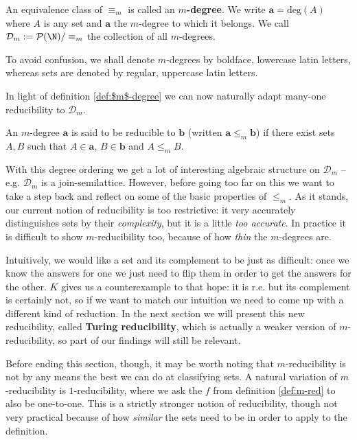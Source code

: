 \documentclass[../main.tex]{memoir}
\begin{document}
\begin{definition}
  \label{def:$m$-degree}
  An equivalence class of $\equiv_m$ is called an \textbf{$m$-degree}. We write $\mathbf{a} = \text{deg}(A)$ where $A$ is any set and $\mathbf{a}$ the $m$-degree to which it belongs. We call $\mathbf{\mathcal{D}}_m := \mathcal{P}(\N) / \equiv_m$ the collection of all $m$-degrees.
\end{definition}

\begin{remark}
  To avoid confusion, we shall denote $m$-degrees by boldface, lowercase latin letters, whereas sets are denoted by regular, uppercase latin letters.
\end{remark}

In light of definition \ref{def:$m$-degree} we can now naturally adapt many-one reducibility to $\mathbf{\mathcal{D}}_m$.

\begin{definition}
  An $m$-degree $\mathbf{a}$ is said to be reducible to $\mathbf{b}$ (written $\mathbf{a} \le_m \mathbf{b}$) if there exist sets $A, B$ such that $A \in \mathbf{a}$, $B \in \mathbf{b}$ and $A \le_m B$.
\end{definition}

With this degree ordering we get a lot of interesting algebraic structure on $\mathbf{\mathcal{D}}_m$ -- e.g. $\mathbf{\mathcal{D}}_m$ is a join-semilattice. However, before going too far on this we want to take a step back and reflect on some of the basic properties of $\le_m$. As it stands, our current notion of reducibility is too restrictive: it very accurately distinguishes sets by their \textit{complexity}, but it is a little \textit{too accurate}. In practice it is difficult to show $m$-reducibility too, because of how \textit{thin} the $m$-degrees are.

Intuitively, we would like a set and its complement to be just as difficult: once we know the answers for one we just need to flip them in order to get the answers for the other. $K$ gives us a counterexample to that hope: it is r.e. but its complement is certainly not, so if we want to match our intuition we need to come up with a different kind of reduction. In the next section we will present this new reducibility, called \textbf{Turing reducibility}, which is actually a weaker version of $m$-reducibility, so part of our findings will still be relevant.

Before ending this section, though, it may be worth noting that $m$-reducibility is not by any means the best we can do at classifying sets. A natural variation of $m$-reducibility is $1$-reducibility, where we ask the $f$ from definition \ref{def:m-red} to also be one-to-one. This is a strictly stronger notion of reducibility, though not very practical because of how \textit{similar} the sets need to be in order to apply to the definition.
\end{document}
